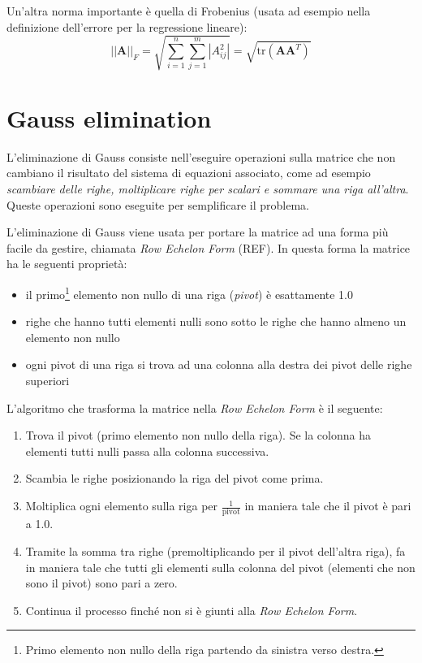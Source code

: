\documentclass[10pt]{article}
\begin{document}
Un'altra norma importante è quella di Frobenius (usata ad esempio nella definizione dell'errore per la regressione lineare):
\begin{equation}
||\mathbf{A}||_F = \sqrt{\sum_{i=1}^n \sum_{j=1}^m |A_{ij}^2|} = 
\sqrt{\text{tr}(\mathbf{A}\mathbf{A}^T)}
\end{equation}



\section{Gauss elimination}

L'eliminazione di Gauss consiste nell'eseguire operazioni sulla matrice che non cambiano il risultato del sistema di equazioni associato, come ad esempio \textit{scambiare delle righe, moltiplicare righe per scalari e sommare una riga all'altra}. Queste operazioni sono eseguite per semplificare il problema.

L'eliminazione di Gauss viene usata per portare la matrice ad una forma più facile da gestire, chiamata \textit{Row Echelon Form} (REF). In questa forma la matrice ha le seguenti proprietà:
\begin{itemize}[noitemsep]
\item il primo\footnote{Primo elemento non nullo della riga partendo da sinistra verso destra.} elemento non nullo di una riga (\emph{pivot}) è esattamente 1.0
\item righe che hanno tutti elementi nulli sono sotto le righe che hanno almeno un elemento non nullo
\item ogni pivot di una riga si trova ad una colonna alla destra dei pivot delle righe superiori
\end{itemize}
L'algoritmo che trasforma la matrice nella \textit{Row Echelon Form} è il seguente:
\begin{enumerate}[noitemsep]
\item Trova il pivot (primo elemento non nullo della riga). Se la colonna ha elementi tutti nulli passa alla colonna successiva.
\item Scambia le righe posizionando la riga del pivot come prima.
\item Moltiplica ogni elemento sulla riga per $\frac{1}{\text{pivot}}$ in maniera tale che il pivot è pari a 1.0.
\item Tramite la somma tra righe (premoltiplicando per il pivot dell'altra riga), fa in maniera tale che tutti gli elementi sulla colonna del pivot (elementi che non sono il pivot) sono pari a zero.
\item Continua il processo finché non si è giunti alla \textit{Row Echelon Form}.
\end{enumerate}
\end{document}
